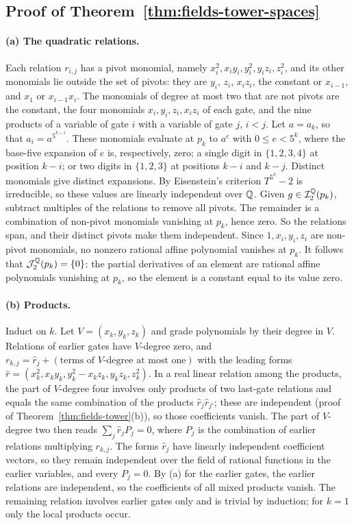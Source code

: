 \subsection{Proof of Theorem~\ref{thm:fields-tower-spaces}}
\label{app:fields-spaces}

\paragraph{(a) The quadratic relations.}
Each relation $r_{i,j}$ has a pivot monomial, namely
$x_i^2,x_iy_i,y_i^2,y_iz_i,z_i^2$, and its other monomials lie outside the
set of pivots: they are $y_i$, $z_i$, $x_iz_i$, the constant or $x_{i-1}$, and
$x_1$ or $x_{i-1}x_i$. The monomials of degree at most two that are not
pivots are the constant, the four monomials $x_i,y_i,z_i,x_iz_i$ of each gate,
and the nine products of a variable of gate $i$ with a variable of gate $j$,
$i<j$. Let $a=a_k$, so that $a_i=a^{5^{k-i}}$. These monomials evaluate at
$p_k$ to $a^e$ with $0\le e<5^k$, where the base-five expansion of $e$ is,
respectively, zero; a single digit in $\{1,2,3,4\}$ at position $k-i$; or
two digits in $\{1,2,3\}$ at positions $k-i$ and $k-j$. Distinct monomials
give distinct expansions. By Eisenstein's criterion $T^{5^k}-2$ is
irreducible, so these values are linearly independent over $\mathbb Q$. Given
$g\in\mathcal I_2^\mathbb Q(p_k)$, subtract multiples of the relations to remove all
pivots. The remainder is a combination of non-pivot monomials vanishing at
$p_k$, hence zero. So the relations span, and their distinct pivots make them
independent. Since $1,x_i,y_i,z_i$ are non-pivot monomials, no nonzero
rational affine polynomial vanishes at $p_k$. It follows that
$\mathcal J_2^\mathbb Q(p_k)=\{0\}$: the partial derivatives of an element are
rational affine polynomials vanishing at $p_k$, so the element is a constant
equal to its value zero.

\paragraph{(b) Products.}
Induct on $k$. Let $V=(x_k,y_k,z_k)$ and grade polynomials by their degree
in $V$. Relations of earlier gates have $V$-degree zero, and
$r_{k,j}=\hat r_j+(\text{terms of }V\text{-degree at most one})$ with the
leading forms $\hat r=(x_k^2,x_ky_k,y_k^2-x_kz_k,y_kz_k,z_k^2)$. In a real
linear relation among the products, the part of $V$-degree four involves
only products of two last-gate relations and equals the same combination of
the products $\hat r_j\hat r_{j'}$; these are independent (proof of
Theorem~\ref{thm:fields-tower}(b)), so those coefficients vanish. The part of
$V$-degree two then reads $\sum_j\hat r_jP_j=0$, where $P_j$ is the
combination of earlier relations multiplying $r_{k,j}$. The forms $\hat r_j$
have linearly independent coefficient vectors, so they remain independent
over the field of rational functions in the earlier variables, and every
$P_j=0$. By (a) for the earlier gates, the earlier relations are independent,
so the coefficients of all mixed products vanish. The remaining relation
involves earlier gates only and is trivial by induction; for $k=1$ only the
local products occur.

